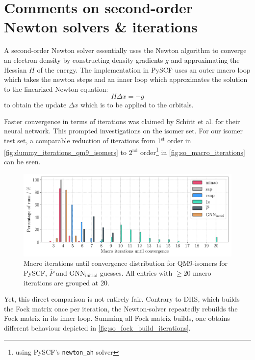 \section{Comments on second-order Newton solvers \& iterations}
\label{sec:notes_on_so_newton}
A second-order Newton solver essentially uses the Newton algorithm to converge an electron density by constructing density gradients $g$ and approximating the Hessian $H$ of the energy. The implementation in PySCF uses an outer macro loop which takes the newton steps and an inner loop which approximates the solution to the linearized Newton equation:
\[H \Delta x = -g\]
to obtain the update $\Delta x$ which is to be applied to the orbitals.

Faster convergence in terms of iterations was claimed by Schütt et al. for their neural network. \parencite{ref:schuett_unifying_2019} This prompted investigations on the  isomer set. For our isomer test set, a comparable reduction of iterations from 1$^\text{st}$ order in \autoref{fig:dummy_iterations_qm9_isomers} to 2$^\text{nd}$ order\footnote{using PySCF's \texttt{newton\_ah} solver} in \autoref{fig:so_macro_iterations} can be seen. 
\begin{figure}[H]
    \centering
    \includegraphics[width=\textwidth]{../fig/gnn/SO_0D_GNN_model_iteration_count_bar.pdf}
    \caption[Macro iterations until convergence distribution for QM9-isomers]{Macro iterations until convergence distribution for QM9-isomers for PySCF, $\overline{P}$ and GNN$_\text{initial}$ guesses. All entries with $\geq 20$ macro iterations are grouped at $20$.}
    \label{fig:so_macro_iterations}
\end{figure}
Yet, this direct comparison is not entirely fair. Contrary to DIIS, which builds the Fock matrix once per iteration, the Newton-solver repeatedly rebuilds the Fock matrix in its inner loop. Summing all Fock matrix builds, one obtains different behaviour depicted in \autoref{fig:so_fock_build_iterations}.  
